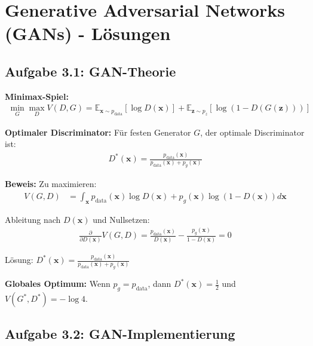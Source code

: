 ﻿\documentclass[12pt,a4paper]{article}
\begin{document}
\section{Generative Adversarial Networks (GANs) - Lösungen}

\subsection{Aufgabe 3.1: GAN-Theorie}

\textbf{Minimax-Spiel:}
\begin{align}
\min_G \max_D V(D, G) = \mathbb{E}_{\mathbf{x} \sim p_{\text{data}}}[\log D(\mathbf{x})] + \mathbb{E}_{\mathbf{z} \sim p_z}[\log(1 - D(G(\mathbf{z})))]
\end{align}

\textbf{Optimaler Discriminator:}
Für festen Generator $G$, der optimale Discriminator ist:
\begin{align}
D^*(\mathbf{x}) = \frac{p_{\text{data}}(\mathbf{x})}{p_{\text{data}}(\mathbf{x}) + p_g(\mathbf{x})}
\end{align}

\textbf{Beweis:}
Zu maximieren:
\begin{align}
V(G, D) &= \int_{\mathbf{x}} p_{\text{data}}(\mathbf{x}) \log D(\mathbf{x}) + p_g(\mathbf{x}) \log(1 - D(\mathbf{x})) d\mathbf{x}
\end{align}

Ableitung nach $D(\mathbf{x})$ und Nullsetzen:
\begin{align}
\frac{\partial}{\partial D(\mathbf{x})} V(G, D) = \frac{p_{\text{data}}(\mathbf{x})}{D(\mathbf{x})} - \frac{p_g(\mathbf{x})}{1 - D(\mathbf{x})} = 0
\end{align}

Lösung: $D^*(\mathbf{x}) = \frac{p_{\text{data}}(\mathbf{x})}{p_{\text{data}}(\mathbf{x}) + p_g(\mathbf{x})}$

\textbf{Globales Optimum:}
Wenn $p_g = p_{\text{data}}$, dann $D^*(\mathbf{x}) = \frac{1}{2}$ und $V(G^*, D^*) = -\log 4$.

\subsection{Aufgabe 3.2: GAN-Implementierung}
\end{document}
